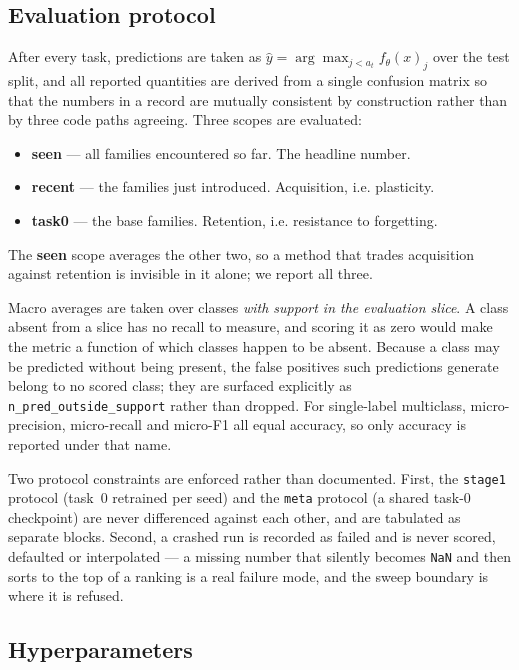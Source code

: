 \subsection{Evaluation protocol}
\label{sec:method:eval}

After every task, predictions are taken as
$\hat{y} = \arg\max_{j < a_t} f_\theta(x)_j$ over the test split, and all
reported quantities are derived from a single confusion matrix so that the
numbers in a record are mutually consistent by construction rather than by three
code paths agreeing. Three scopes are evaluated:
\begin{itemize}
  \item \textbf{seen} --- all families encountered so far. The headline number.
  \item \textbf{recent} --- the families just introduced. Acquisition, i.e.
        plasticity.
  \item \textbf{task0} --- the base families. Retention, i.e. resistance to
        forgetting.
\end{itemize}
The \textbf{seen} scope averages the other two, so a method that trades
acquisition against retention is invisible in it alone; we report all three.

Macro averages are taken over classes \emph{with support in the evaluation
slice}. A class absent from a slice has no recall to measure, and scoring it as
zero would make the metric a function of which classes happen to be absent.
Because a class may be predicted without being present, the false positives such
predictions generate belong to no scored class; they are surfaced explicitly as
\texttt{n\_pred\_outside\_support} rather than dropped. For single-label
multiclass, micro-precision, micro-recall and micro-F1 all equal accuracy, so
only accuracy is reported under that name.

Two protocol constraints are enforced rather than documented. First, the
\texttt{stage1} protocol (task~0 retrained per seed) and the \texttt{meta}
protocol (a shared task-0 checkpoint) are never differenced against each other,
and are tabulated as separate blocks. Second, a crashed run is recorded as failed
and is never scored, defaulted or interpolated --- a missing number that silently
becomes \texttt{NaN} and then sorts to the top of a ranking is a real failure
mode, and the sweep boundary is where it is refused.

\subsection{Hyperparameters}
\label{sec:method:hparams}

